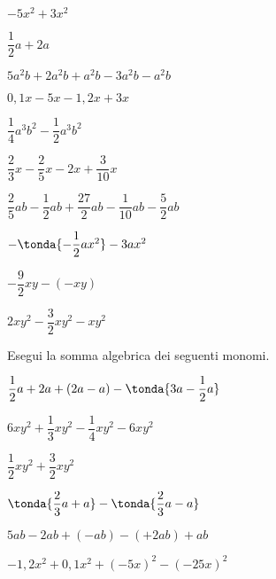 \begin{esercizio}
\begin{htmulticols}{3}
\begin{enumeratea}
\item \(-5x^{2}+3x^{2}\)
\item \(\dfrac{1}{2}a+2a\)
\item \(5a^{2}b+2a^{2}b+a^{2}b-3a^{2}b-a^{2}b\)
\item \(0,1x-5x-1,2x+3x\)
% 
\spazielenx
\item \(\dfrac{1}{4}a^{3}b^{2}-\dfrac{1}{2}a^{3}b^{2}\)
\item \(\dfrac{2}{3}x-\dfrac{2}{5}x-2x+\dfrac{3}{10}x\)
\item 
\(\dfrac{2}{5}ab-\dfrac{1}{2}ab+\dfrac{27}{2}ab-\dfrac{1}{10}ab-
\dfrac{5}{2}ab\)
\item \(-\tonda{-{\dfrac{1}{2}}ax^{2}}-3ax^{2}\)
\item \(-{\dfrac{9}{2}}xy-(-xy)\)
\item \(2xy^{2}-\dfrac{3}{2}xy^{2}-xy^{2}\)
\end{enumeratea}
\end{htmulticols}
\end{esercizio}

\pagebreak %

\begin{esercizio}
\label{ese:9.30}
Esegui la somma algebrica dei seguenti monomi.
\begin{htmulticols}{2}
\begin{enumeratea}
\spazielenx
\item \(\dfrac{1}{2}a+2a+(2a-a)-\tonda{3a-\dfrac{1}{2}a}\)
\item \(6xy^{2}+\dfrac{1}{3}xy^{2}-\dfrac{1}{4}xy^{2}-6xy^{2}\)
\item \(\dfrac{1}{2}xy^{2}+\dfrac{3}{2}xy^{2}\)
\item \(\tonda{\dfrac{2}{3}a+a}-\tonda{\dfrac{2}{3}a-a}\)
\item \(5ab-2ab+(-ab)-(+2ab)+ab\)
\item \(-1,2x^{2}+0,1x^{2}+(-5x)^{2}-(-25x)^{2}\)
\end{enumeratea}
\end{htmulticols}

\end{esercizio}


